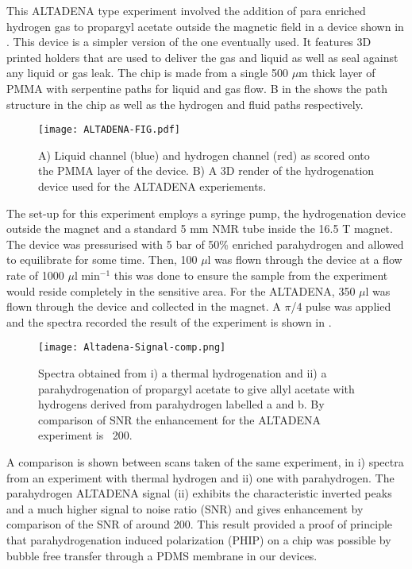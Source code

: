 This ALTADENA type experiment involved the addition of para enriched hydrogen
gas to propargyl acetate outside the magnetic field in a device shown in . This device
is a simpler version of the one eventually used.
It features 3D printed holders that are used to deliver the gas and liquid as
well as seal against any liquid or gas leak. The chip is made from a single 500
$\mu$m thick layer of PMMA with serpentine paths for liquid and gas flow. B in the
 shows the path structure in the chip as well as the hydrogen and fluid paths
respectively.

\begin{figure}
  \begin{center}
  \texttt{[image: ALTADENA-FIG.pdf]}
  \end{center}
  \caption{A) Liquid channel (blue) and hydrogen channel (red) as scored
  onto the PMMA layer of the device. B) A 3D render of the hydrogenation device
  used for the ALTADENA experiements.}
  \label{fig:AltadenaChip}
\end{figure}

The set-up for this experiment employs a syringe pump, the hydrogenation device
outside the magnet and a standard 5 mm NMR tube inside the 16.5 T magnet. The device
was pressurised with 5 bar of 50\% enriched parahydrogen and allowed to equilibrate
for some time. Then, 100 $\mu$l was flown through the device at a flow rate of 1000
$\mu$l min$^{-1}$ this was done to ensure the sample from the experiment would reside
completely in the sensitive area. For the ALTADENA, 350 $\mu$l was flown through
the device and collected in the magnet. A $\pi$/4 pulse was applied and the spectra
recorded the result of the experiment is shown in .

\begin{figure}
  \begin{center}
  \texttt{[image: Altadena-Signal-comp.png]}
  \end{center}
  \caption{Spectra obtained from i) a thermal hydrogenation and ii) a parahydrogenation
  of propargyl acetate to give allyl acetate with hydrogens derived from parahydrogen labelled a and
  b. By comparison of SNR the enhancement for the ALTADENA experiment is ~200. }
  \label{fig:AltadenaResults}
\end{figure}

A comparison is shown between scans taken of the same experiment, in  i) spectra
from an experiment with thermal hydrogen and ii) one with parahydrogen. The parahydrogen
ALTADENA signal (ii) exhibits the characteristic inverted peaks and a much higher signal
to noise ratio (SNR) and gives enhancement by comparison of the SNR of around 200.
This result provided a proof of principle that parahydrogenation induced polarization (PHIP) on a chip
was possible by bubble free transfer through a PDMS membrane in our devices.

